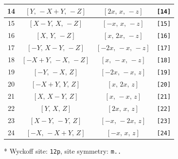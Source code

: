 \documentclass[fleqn,8pt]{jsarticle}
\begin{document}
\begin{longtable}{cccc}
14 & $\left[ Y,\, - X + Y,\, - Z \right]$ & $\left[ 2 x,\, x,\, - z \right]$ & {\tt [14]} \\ \hline
15 & $\left[ X - Y,\, X,\, - Z \right]$ & $\left[ - x,\, x,\, - z \right]$ & {\tt [15]} \\ \hline
16 & $\left[ X,\, Y,\, - Z \right]$ & $\left[ x,\, 2 x,\, - z \right]$ & {\tt [16]} \\ \hline
17 & $\left[ - Y,\, X - Y,\, - Z \right]$ & $\left[ - 2 x,\, - x,\, - z \right]$ & {\tt [17]} \\ \hline
18 & $\left[ - X + Y,\, - X,\, - Z \right]$ & $\left[ x,\, - x,\, - z \right]$ & {\tt [18]} \\ \hline
19 & $\left[ - Y,\, - X,\, Z \right]$ & $\left[ - 2 x,\, - x,\, z \right]$ & {\tt [19]} \\ \hline
20 & $\left[ - X + Y,\, Y,\, Z \right]$ & $\left[ x,\, 2 x,\, z \right]$ & {\tt [20]} \\ \hline
21 & $\left[ X,\, X - Y,\, Z \right]$ & $\left[ x,\, - x,\, z \right]$ & {\tt [21]} \\ \hline
22 & $\left[ Y,\, X,\, Z \right]$ & $\left[ 2 x,\, x,\, z \right]$ & {\tt [22]} \\ \hline
23 & $\left[ X - Y,\, - Y,\, Z \right]$ & $\left[ - x,\, - 2 x,\, z \right]$ & {\tt [23]} \\ \hline
24 & $\left[ - X,\, - X + Y,\, Z \right]$ & $\left[ - x,\, x,\, z \right]$ & {\tt [24]} \\
\end{longtable}
* Wyckoff site: {\tt 12p}, site symmetry: {\tt m..}
\renewcommand{\arraystretch}{1.2}
\end{document}
